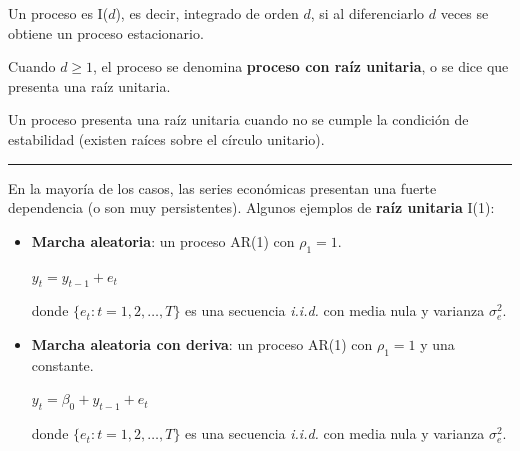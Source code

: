  \begin{f}
 	
 	Un proceso es I(\(d\)), es decir, integrado de orden \(d\), si al diferenciarlo \(d\) veces se obtiene un proceso estacionario.
 	
 	Cuando \(d \geq 1\), el proceso se denomina \textbf{proceso con raíz unitaria}, o se dice que presenta una raíz unitaria.
 	
 	Un proceso presenta una raíz unitaria cuando no se cumple la condición de estabilidad (existen raíces sobre el círculo unitario).
 	
 \end{f}  \hrule
 
\begin{f}
	
	En la mayoría de los casos, las series económicas presentan una fuerte dependencia (o son muy persistentes). Algunos ejemplos de \textbf{raíz unitaria} I(1):
	
	\begin{itemize}[leftmargin=*]
		\item \textbf{Marcha aleatoria}: un proceso AR(1) con \(\rho_{1} = 1\).
		
		\begin{center}
			\(y_{t} = y_{t - 1} + e_{t}\)
		\end{center}
		
		donde \(\lbrace e_{t} : t = 1, 2, \ldots, T \rbrace\) es una secuencia \textsl{i.i.d.} con media nula y varianza \(\sigma^{2}_{e}\).
		
		\item \textbf{Marcha aleatoria con deriva}: un proceso AR(1) con \(\rho_{1} = 1\) y una constante.
		
		\begin{center}
			\(y_{t} = \beta_{0} + y_{t - 1} + e_{t}\)
		\end{center}
		
		donde \(\lbrace e_{t} : t = 1, 2, \ldots, T \rbrace\) es una secuencia \textsl{i.i.d.} con media nula y varianza \(\sigma^{2}_{e}\).
	\end{itemize}
	
\end{f} 

